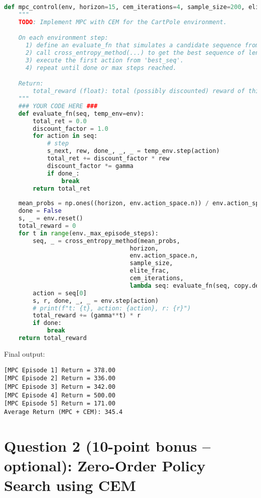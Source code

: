 \documentclass{article}
\begin{document}
\begin{solution}
\begin{lstlisting}[language=Python]
def mpc_control(env, horizon=15, cem_iterations=4, sample_size=200, elite_frac=0.1, gamma=1.0):
    """
    TODO: Implement MPC with CEM for the CartPole environment.

    On each environment step:
      1) define an evaluate_fn that simulates a candidate sequence from the *current state* (or an approximation).
      2) call cross_entropy_method(...) to get the best sequence of length 'horizon'.
      3) execute the first action from 'best_seq'.
      4) repeat until done or max steps reached.

    Return:
        total_reward (float): total (possibly discounted) reward of this episode.
    """
    ### YOUR CODE HERE ###      
    def evaluate_fn(seq, temp_env=env):
        total_ret = 0.0
        discount_factor = 1.0
        for action in seq:
            # step
            s_next, rew, done_, _, _ = temp_env.step(action)
            total_ret += discount_factor * rew
            discount_factor *= gamma
            if done_:
                break
        return total_ret
      
    mean_probs = np.ones((horizon, env.action_space.n)) / env.action_space.n
    done = False
    s, _ = env.reset()
    total_reward = 0
    for t in range(env._max_episode_steps):
        seq, _ = cross_entropy_method(mean_probs, 
                                   horizon, 
                                   env.action_space.n, 
                                   sample_size, 
                                   elite_frac, 
                                   cem_iterations, 
                                   lambda seq: evaluate_fn(seq, copy.deepcopy(env)))
        action = seq[0]
        s, r, done, _, _ = env.step(action)
        # print(f"t: {t}, action: {action}, r: {r}")
        total_reward += (gamma**t) * r
        if done:
            break
    return total_reward
\end{lstlisting}
Final output:
\begin{lstlisting}
[MPC Episode 1] Return = 378.00
[MPC Episode 2] Return = 336.00
[MPC Episode 3] Return = 342.00
[MPC Episode 4] Return = 500.00
[MPC Episode 5] Return = 171.00
Average Return (MPC + CEM): 345.4
\end{lstlisting}
\end{solution}

\section*{Question 2 (10-point bonus -- optional): Zero-Order Policy Search using CEM}
\end{document}

